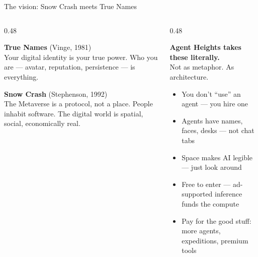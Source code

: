 \documentclass[aspectratio=169]{beamer}
\begin{document}
\begin{frame}{The vision: Snow Crash meets True Names}
  \begin{columns}[T]
    \begin{column}{0.48\textwidth}
      \begin{tcolorbox}[colback=bglight, colframe=accent, sharp corners, boxrule=0.5pt]
        \small\color{textmain}
        \textbf{\color{accentdark}True Names} (Vinge, 1981)\\[2pt]
        \footnotesize Your digital identity is your true power. \alert{Who you are} --- avatar, reputation, persistence --- is everything.
      \end{tcolorbox}
      \vspace{4pt}
      \begin{tcolorbox}[colback=bglight, colframe=accent, sharp corners, boxrule=0.5pt]
        \small\color{textmain}
        \textbf{\color{accentdark}Snow Crash} (Stephenson, 1992)\\[2pt]
        \footnotesize The Metaverse is a \alert{protocol}, not a place. People \alert{inhabit} software. The digital world is spatial, social, economically real.
      \end{tcolorbox}
    \end{column}
    \begin{column}{0.48\textwidth}
      \begin{tcolorbox}[colback=accent!8, colframe=accent, sharp corners, boxrule=1pt]
        \small\color{textmain}
        \centering\textbf{\color{accentdark}Agent Heights takes these literally.}\\[2pt]
        \footnotesize Not as metaphor. As architecture.
      \end{tcolorbox}
      \vspace{6pt}
      \begin{itemize}
        \footnotesize
        \item You don't ``use'' an agent --- you \alert{hire} one
        \item Agents have \alert{names, faces, desks} --- not chat tabs
        \item \alert{Space makes AI legible} --- just look around
        \item Free to enter --- \alert{ad-supported inference} funds the compute
        \item Pay for the good stuff: more agents, expeditions, premium tools
      \end{itemize}
    \end{column}
  \end{columns}
\end{frame}
\end{document}

